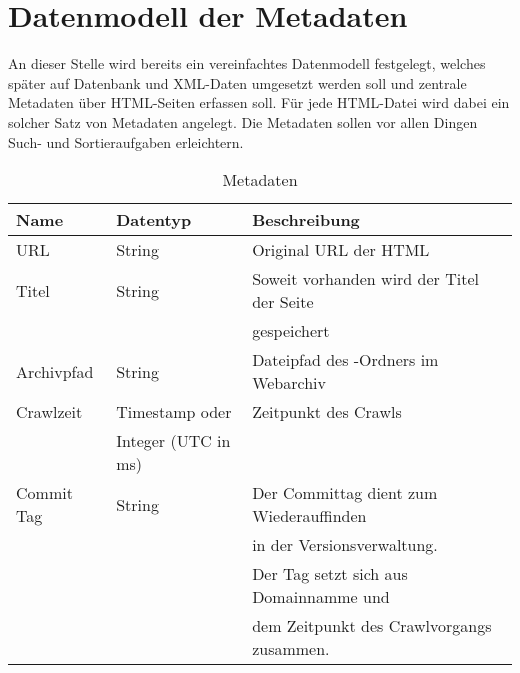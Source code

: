 \chapter{Datenmodell der Metadaten} \label{spec:model}
An dieser Stelle wird bereits ein vereinfachtes Datenmodell festgelegt, welches
später auf Datenbank und XML-Daten umgesetzt werden soll und zentrale Metadaten über HTML-Seiten erfassen soll. Für jede HTML-Datei wird dabei ein solcher Satz von Metadaten angelegt.
Die Metadaten sollen vor allen Dingen Such- und Sortieraufgaben erleichtern. 

\begin{table}[h]
\centering
\begin{tabular}{|l|l|l|}	
	\hline
	Name 		& Datentyp 				& Beschreibung \\
	\hline
	URL 		& String 				& Original URL der HTML\\
	Titel 		& String 				& Soweit vorhanden wird der Titel der Seite \\ 
	 			& 						& gespeichert \\ 
	Archivpfad 	& String 				& Dateipfad des \htmlarc-Ordners im Webarchiv \\
	Crawlzeit 	& Timestamp oder 		& Zeitpunkt des Crawls \\
				& Integer (UTC in ms) 	&  \\
	Commit Tag 	& String 				& Der Committag dient zum Wiederauffinden \\
	 			& 						& in der Versionsverwaltung. \\ 
				& 						& Der Tag setzt sich aus Domainnamme und \\
				& 						& dem Zeitpunkt des Crawlvorgangs zusammen.\\
	\hline
\end{tabular}
\caption{Metadaten}
\end{table}

